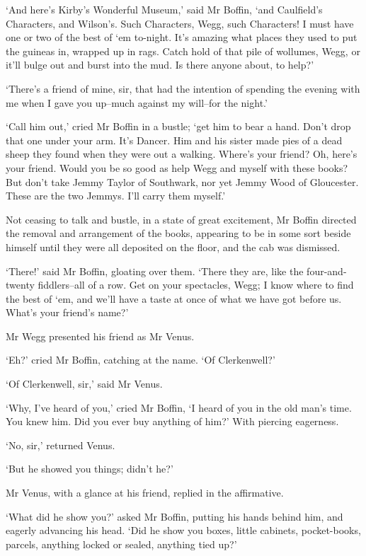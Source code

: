 ‘And here’s Kirby’s Wonderful Museum,’ said Mr Boffin, ‘and Caulfield’s
Characters, and Wilson’s. Such Characters, Wegg, such Characters! I must
have one or two of the best of ‘em to-night. It’s amazing what places
they used to put the guineas in, wrapped up in rags. Catch hold of that
pile of wollumes, Wegg, or it’ll bulge out and burst into the mud. Is
there anyone about, to help?’

‘There’s a friend of mine, sir, that had the intention of spending
the evening with me when I gave you up--much against my will--for the
night.’

‘Call him out,’ cried Mr Boffin in a bustle; ‘get him to bear a hand.
Don’t drop that one under your arm. It’s Dancer. Him and his sister made
pies of a dead sheep they found when they were out a walking. Where’s
your friend? Oh, here’s your friend. Would you be so good as help Wegg
and myself with these books? But don’t take Jemmy Taylor of Southwark,
nor yet Jemmy Wood of Gloucester. These are the two Jemmys. I’ll carry
them myself.’

Not ceasing to talk and bustle, in a state of great excitement, Mr
Boffin directed the removal and arrangement of the books, appearing
to be in some sort beside himself until they were all deposited on the
floor, and the cab was dismissed.

‘There!’ said Mr Boffin, gloating over them. ‘There they are, like the
four-and-twenty fiddlers--all of a row. Get on your spectacles, Wegg;
I know where to find the best of ‘em, and we’ll have a taste at once of
what we have got before us. What’s your friend’s name?’

Mr Wegg presented his friend as Mr Venus.

‘Eh?’ cried Mr Boffin, catching at the name. ‘Of Clerkenwell?’

‘Of Clerkenwell, sir,’ said Mr Venus.

‘Why, I’ve heard of you,’ cried Mr Boffin, ‘I heard of you in the
old man’s time. You knew him. Did you ever buy anything of him?’ With
piercing eagerness.

‘No, sir,’ returned Venus.

‘But he showed you things; didn’t he?’

Mr Venus, with a glance at his friend, replied in the affirmative.

‘What did he show you?’ asked Mr Boffin, putting his hands behind him,
and eagerly advancing his head. ‘Did he show you boxes, little cabinets,
pocket-books, parcels, anything locked or sealed, anything tied up?’

